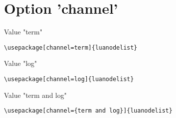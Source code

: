 \documentclass{article}
\begin{document}
\section{Option 'channel'}

Value "term"


\begin{lstlisting}
\usepackage[channel=term]{luanodelist}
\end{lstlisting}

Value "log"

\begin{lstlisting}
\usepackage[channel=log]{luanodelist}
\end{lstlisting}

Value "term and log"

\begin{lstlisting}
\usepackage[channel={term and log}]{luanodelist}
\end{lstlisting}
\end{document}
